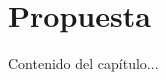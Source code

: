 \documentclass[../main.tex]{subfiles}
\begin{document}
\chapter{Propuesta}
\label{C:propuesta}

Contenido del capítulo...
\end{document}
